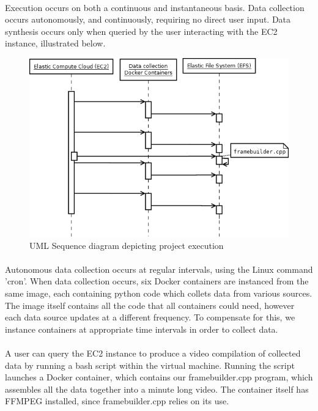 \documentclass{article}
\begin{document}
  \paragraph{}
  Execution occurs on both a continuous and instantaneous basis. Data collection occurs autonomously, and continuously, requiring no direct user input. Data synthesis occurs only when queried by the user interacting with the EC2 instance, illustrated below.
  \begin{figure}[H]
    \centering
    \includegraphics[width=0.8\linewidth]{img/sequence_diagram.png}
    \caption{UML Sequence diagram depicting project execution}
    \label{seuqence_diagram}
  \end{figure}
  \paragraph{}
  Autonomous data collection occurs at regular intervals, using the Linux command 'cron'. When data collection occurs, six Docker containers are instanced from the same image, each containing python code which collets data from various sources. The image itself contains all the code that all containers could need, however each data source updates at a different frequency. To compensate for this, we instance containers at appropriate time intervals in order to collect data.
  \paragraph{}
  A user can query the EC2 instance to produce a video compilation of collected data by running a bash script within the virtual machine. Running the script launches a Docker container, which contains our framebuilder.cpp program, which assembles all the data together into a minute long video. The container itself has FFMPEG installed, since framebuilder.cpp relies on its use.
\end{document}
